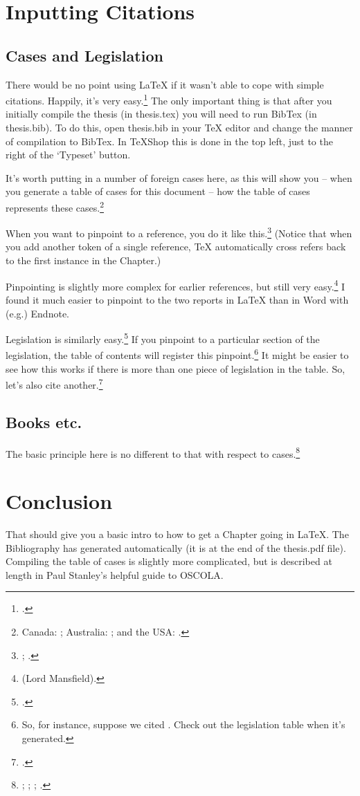 \section{Inputting Citations}
\subsection{Cases and Legislation}
There would be no point using LaTeX if it wasn't able to cope with simple citations. Happily, it's very easy.\footnote{\cite{achilleas}.} The only important thing is that after you initially compile the thesis (in thesis.tex) you will need to run BibTex (in thesis.bib). To do this, open thesis.bib in your TeX editor and change the manner of compilation to BibTex. In TeXShop this is done in the top left, just to the right of the `Typeset' button. 

It's worth putting in a number of foreign cases here, as this will show you -- when you generate a table of cases for this document -- how the table of cases represents these cases.\footnote{Canada: \cite{deglman}; Australia: \cite{roxborough}; and the USA: \cite{boomer}.}

When you want to pinpoint to a reference, you do it like this.\footnote{\cite[10]{achilleas}; \cite[10]{benedettisc}.} (Notice that when you add another token of a single reference, TeX automatically cross refers back to the first instance in the Chapter.)

Pinpointing is slightly more complex for earlier references, but still very easy.\footnote{\cite[1012|680--81]{moses} (Lord Mansfield).} I found it much easier to pinpoint to the two reports in LaTeX than in Word with (e.g.) Endnote. 

Legislation is similarly easy.\footnote{\cite{sga}.} If you pinpoint to a particular section of the legislation, the table of contents will register this pinpoint.\footnote{So, for instance, suppose we cited \cite[12]{sga}. Check out the legislation table when it's generated.} It might be easier to see how this works if there is more than one piece of legislation in the table. So, let's also cite another.\footnote{\cite{frustrated}.}

\subsection{Books etc.}
The basic principle here is no different to that with respect to cases.\footnote{\cite{stevens08}; \cite{stevens}; \cite{defeaters}; \cite{reynolds63}.}

\section{Conclusion}
That should give you a basic intro to how to get a Chapter going in LaTeX. The Bibliography has generated automatically (it is at the end of the thesis.pdf file). Compiling the table of cases is slightly more complicated, but is described at length in Paul Stanley's helpful guide to OSCOLA. 
